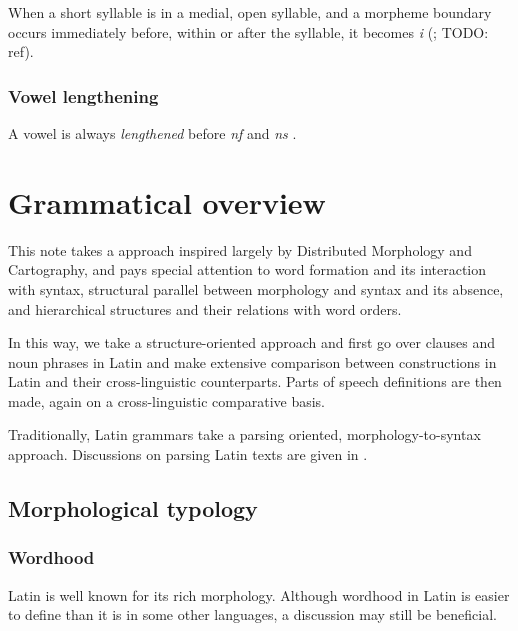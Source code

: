 \documentclass[a4paper, oneside, 12pt]{report}
\newcommand*{\citepage}[1]{p.~{#1}}
\newcommand{\form}[1]{\emph{#1}}
\begin{document}
When a short syllable is in a medial, open syllable,
and a morpheme boundary occurs immediately before, within or after the syllable,
it becomes \form{i} 
(\citealt[\citepage{55}]{oniga2014latin}; TODO: ref).

\subsection{Vowel lengthening}

A vowel is always \emph{lengthened} before \form{nf} and \form{ns}
\citep[\citepage{55}]{oniga2014latin}.

\chapter{Grammatical overview}

This note takes a approach inspired largely by Distributed Morphology and Cartography,
and pays special attention to word formation and its interaction with syntax,
structural parallel between morphology and syntax and its absence,
and hierarchical structures and their relations with word orders. 

In this way, we take a structure-oriented approach and first go over clauses and noun phrases in Latin and make extensive comparison between constructions in Latin and their cross-linguistic counterparts.
Parts of speech definitions are then made, again on a cross-linguistic comparative basis.

Traditionally, Latin grammars take a parsing oriented, morphology-to-syntax approach.
Discussions on parsing Latin texts are given in .

\section{Morphological typology}

\subsection{Wordhood}\label{sec:grammatical.word}

Latin is well known for its rich morphology.
Although wordhood in Latin is easier to define than it is in some other languages,
a discussion may still be beneficial.
\end{document}
